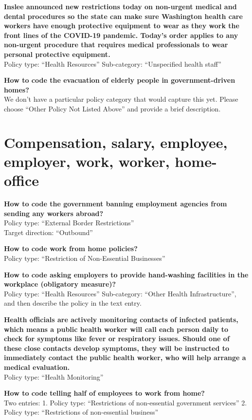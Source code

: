 \documentclass[
]{book}
\begin{document}
\textbf{Inslee announced new restrictions today on non-urgent medical and dental procedures so the state can make sure Washington health care workers have enough protective equipment to wear as they work the front lines of the COVID-19 pandemic. Today's order applies to any non-urgent procedure that requires medical professionals to wear personal protective equipment.}\\
Policy type: ``Health Resources''
Sub-category: ``Unspecified health staff''

\textbf{How to code the evacuation of elderly people in government-driven homes?}\\
We don't have a particular policy category that would capture this yet. Please choose ``Other Policy Not Listed Above'' and provide a brief description.

\hypertarget{compensation-salary-employee-employer-work-worker-home-office}{%
\section{Compensation, salary, employee, employer, work, worker, home-office}\label{compensation-salary-employee-employer-work-worker-home-office}}

\textbf{How to code the government banning employment agencies from sending any workers abroad?}\\
Policy type: ``External Border Restrictions''\\
Target direction: ``Outbound''

\textbf{How to code work from home policies?}\\
Policy type: ``Restriction of Non-Essential Businesses''

\textbf{How to code asking employers to provide hand-washing facilities in the workplace (obligatory measure)?}\\
Policy type: ``Health Resources''
Sub-category: ``Other Health Infrastructure'', and then describe the policy in the text entry.

\textbf{Health officials are actively monitoring contacts of infected patients, which means a public health worker will call each person daily to check for symptoms like fever or respiratory issues. Should one of these close contacts develop symptoms, they will be instructed to immediately contact the public health worker, who will help arrange a medical evaluation.}\\
Policy type: ``Health Monitoring''

\textbf{How to code telling half of employees to work from home?}\\
Two entries:
1. Policy type: ``Restrictions of non-essential government services''
2. Policy type: ``Restrictions of non-essential business''
\end{document}
